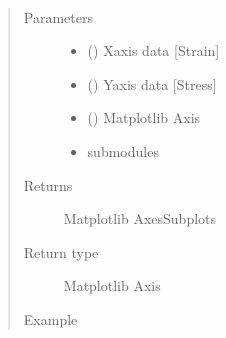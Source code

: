 \documentclass[letterpaper,10pt,english]{sphinxmanual}
\begin{document}
\begin{fulllineitems}
\begin{fulllineitems}
\end{fulllineitems}


\begin{fulllineitems}
\label{\detokenize{openfdem:openfdem.openfdem.Model.plot_stress_strain}}~\begin{quote}\begin{description}
\item[{Parameters}] \leavevmode\begin{itemize}
\item {} 
 () \textendash{} X\sphinxhyphen{}axis data {[}Strain{]}

\item {} 
 () \textendash{} Y\sphinxhyphen{}axis data {[}Stress{]}

\item {} 
 () \textendash{} Matplotlib Axis

\item {} 
 \textendash{}  submodules

\end{itemize}

\item[{Returns}] \leavevmode
Matplotlib AxesSubplots

\item[{Return type}] \leavevmode
Matplotlib Axis

\item[{Example}] \leavevmode
\begin{sphinxVerbatim}[commandchars=\\\{\}]
   
  


\end{sphinxVerbatim}
\end{description}
\end{quote}
\end{fulllineitems}
\end{fulllineitems}
\end{document}
